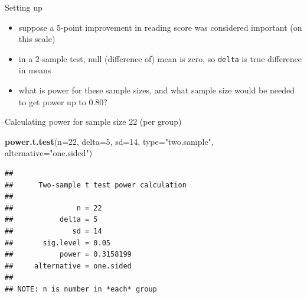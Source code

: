 \documentclass[
  ignorenonframetext,
]{beamer}
\newenvironment{Shaded}{\begin{snugshade}}{\end{snugshade}}
\newcommand{\DataTypeTok}[1]{\textcolor[rgb]{0.13,0.29,0.53}{#1}}
\newcommand{\DecValTok}[1]{\textcolor[rgb]{0.00,0.00,0.81}{#1}}
\newcommand{\KeywordTok}[1]{\textcolor[rgb]{0.13,0.29,0.53}{\textbf{#1}}}
\newcommand{\NormalTok}[1]{#1}
\newcommand{\StringTok}[1]{\textcolor[rgb]{0.31,0.60,0.02}{#1}}
\providecommand{\tightlist}{%
  \setlength{\itemsep}{0pt}\setlength{\parskip}{0pt}}
\begin{document}
\begin{frame}[fragile]{Setting up}
\protect\hypertarget{setting-up}{}

\begin{itemize}
\tightlist
\item
  suppose a 5-point improvement in reading score was considered
  important (on this scale)
\item
  in a 2-sample test, null (difference of) mean is zero, so
  \texttt{delta} is true difference in means
\item
  what is power for these sample sizes, and what sample size would be
  needed to get power up to 0.80?
\end{itemize}

\end{frame}

\begin{frame}[fragile]{Calculating power for sample size 22 (per group)}
\protect\hypertarget{calculating-power-for-sample-size-22-per-group}{}

\begin{Shaded}
\begin{Highlighting}[]
\KeywordTok{power.t.test}\NormalTok{(}\DataTypeTok{n=}\DecValTok{22}\NormalTok{, }\DataTypeTok{delta=}\DecValTok{5}\NormalTok{, }\DataTypeTok{sd=}\DecValTok{14}\NormalTok{, }\DataTypeTok{type=}\StringTok{"two.sample"}\NormalTok{, }
             \DataTypeTok{alternative=}\StringTok{"one.sided"}\NormalTok{)}
\end{Highlighting}
\end{Shaded}

\begin{verbatim}
## 
##      Two-sample t test power calculation 
## 
##               n = 22
##           delta = 5
##              sd = 14
##       sig.level = 0.05
##           power = 0.3158199
##     alternative = one.sided
## 
## NOTE: n is number in *each* group
\end{verbatim}

\end{frame}
\end{document}
